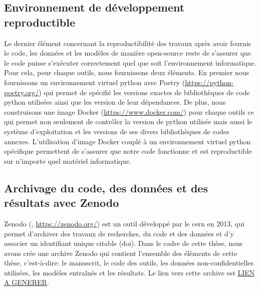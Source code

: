 \subsection{Environnement de développement reproductible}
Le dernier élément concernant la reproductibilité des travaux après avoir fournis le code, les données et les modèles de manière open-source reste de s'assurer que le code puisse s'exécuter correctement quel que soit l'environnement informatique. Pour cela, pour chaque outils, nous fournissons deux éléments. En premier nous fournissons un environnement virtuel python avec Poetry (\href{https://python-poetry.org/}{https://python-poetry.org/}) qui permet de spécifié les versions exactes de bibliothèques de code python utilisées ainsi que les version de leur dépendances. De plus, nous construisons une image Docker (\href{https://www.docker.com/}{https://www.docker.com/}) pour chaque outils ce qui permet non seulement de contrôler la version de python utilisée mais aussi le système d'exploitation et les versions de ses divers bibliothèques de codes annexes. L'utilisation d'image Docker couplé à un environnement virtuel python spécifique permettent de s'assurer que notre code fonctionne et est reproductible sur n'importe quel matériel informatique.

\subsection{Archivage du code, des données et des résultats avec Zenodo}
Zenodo  (\cite{european_organization_for_nuclear_research_zenodo_2013}, \href{https://zenodo.org/}{https://zenodo.org/}) est un outil développé par le \gls{cern} en 2013, qui permet d'archiver des travaux de recherches, du code et des données et d'y associer un identifiant unique citable (\gls{doi}). Dans le cadre de cette thèse, nous avons crée une archive Zenodo qui contient l'ensemble des éléments de cette thèse, c'est-à-dire: le manuscrit, le code des outils, les données non-confidentielles utilisées, les modèles entraînés et les résultats. Le lien vers cette archive est \href{LIEN A GENERER}{LIEN A GENERER}.